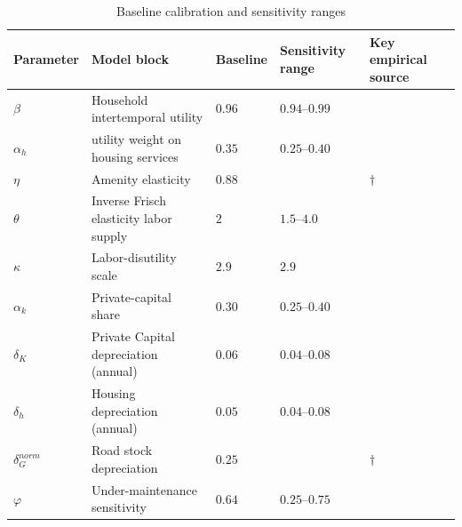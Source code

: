 \begin{table}[htbp]
\centering
\caption{Baseline calibration and sensitivity ranges}
\begin{tabularx}{\textwidth}{
  >{\raggedright\arraybackslash}p{2.2cm}   %
  >{\raggedright\arraybackslash}p{3.4cm}   %
  >{\centering\arraybackslash}p{2.2cm}     %
  >{\centering\arraybackslash}p{2.8cm}     %
  >{\raggedright\arraybackslash}p{3.8cm}   %
}
\toprule
\textbf{Parameter} & \textbf{Model block} & \textbf{Baseline} & \textbf{Sensitivity range} & \textbf{Key empirical source} \\ 
\midrule
$\beta$               & Household intertemporal utility             & $0.96$    & $0.94$–$0.99$          & \citet{cooley1995frontiers} \\ 
$\alpha_h$            & utility weight on housing services                        & $0.35$                & $0.25$–$0.40$            & \citep{bls2023consumer} \\ 
$\eta$              & Amenity elasticity                & $0.88$                &             & $\dagger$ \\ 
$\theta$                & Inverse Frisch elasticity labor supply    & $2$                & $1.5$–$4.0$            & \citet{chetty2011micro} \\ 
$\kappa$              & Labor-disutility scale                 & $2.9$ & $2.9$        &  \cite{chatterjee2017optimal} \\ 
$\alpha_k$            & Private-capital share                       & $0.30$                & $0.25$–$0.40$            & \citet{chatterjee2017optimal} \\ 
$\delta_{K}$          & Private Capital depreciation (annual)       & $0.06$               & $0.04$–$0.08$            & \citet{cooley1995frontiers} \\ 
$\delta_{h}$          & Housing depreciation (annual)       & $0.05$               & $0.04$–$0.08$            &  \\ 
$\delta_{G}^{norm}$          & Road stock depreciation            & $0.25$               &           &  $\dagger$ \\ 
$\varphi$             & Under-maintenance sensitivity                      & $0.64$                & $0.25$–$0.75$            & \citet{rioja2003} \\ 

\end{tabularx}
\end{table}
